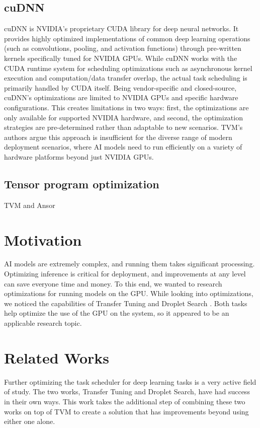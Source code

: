 \documentclass[conference]{IEEEtran}
\begin{document}
\subsection{cuDNN}
cuDNN \cite{chetlur_cudnn_2014} is NVIDIA's proprietary CUDA library for deep neural networks. It provides highly optimized implementations of common deep learning operations (such as convolutions, pooling, and activation functions) through pre-written kernels specifically tuned for NVIDIA GPUs. While cuDNN works with the CUDA runtime system for scheduling optimizations such as asynchronous kernel execution and computation/data transfer overlap, the actual task scheduling is primarily handled by CUDA itself. Being vendor-specific and closed-source, cuDNN's optimizations are limited to NVIDIA GPUs and specific hardware configurations. This creates limitations in two ways: first, the optimizations are only available for supported NVIDIA hardware, and second, the optimization strategies are pre-determined rather than adaptable to new scenarios. TVM's authors argue this approach is insufficient for the diverse range of modern deployment scenarios, where AI models need to run efficiently on a variety of hardware platforms beyond just NVIDIA GPUs.

\subsection{Tensor program optimization}
TVM and Ansor

\cite{chen_tvm_2018}

\section{Motivation}
AI models are extremely complex, and running them takes significant processing. Optimizing inference is critical for deployment, and improvements at any level can save everyone time and money. To this end, we wanted to research optimizations for running models on the GPU. While looking into optimizations, we noticed the capabilities of Transfer Tuning \cite{gibson_transfer-tuning_2022} and Droplet Search \cite{canesche_droplet_2024, canesche_explore_2024}. Both tasks help optimize the use of the GPU on the system, so it appeared to be an applicable research topic.

\section{Related Works}
Further optimizing the task scheduler for deep learning tasks is a very active field of study. The two works, Transfer Tuning and Droplet Search, have had success in their own ways. This work takes the additional step of combining these two works on top of TVM to create a solution that has improvements beyond using either one alone.
\end{document}
